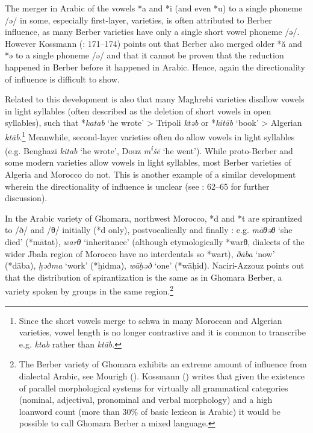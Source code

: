 \documentclass[output=paper]{langsci/langscibook}
\begin{document}
  The merger in Arabic of the vowels *{a} and *{i} (and even *{u}) to a single phoneme /ǝ/ in some, especially first-layer, varieties, is often attributed to Berber influence, as many Berber varieties have only a single short vowel phoneme /ǝ/. However Kossmann (\citeyear{Kossmann2013book}: 171–174) points out that Berber also merged older *ă and *ǝ to a single phoneme /ǝ/ and that it cannot be proven that the reduction happened in Berber before it happened in Arabic. Hence, again the directionality of influence is difficult to show.

  Related to this development is also that many Maghrebi varieties disallow vowels in light syllables (often described as the deletion of short vowels in open syllables), such that *\textit{katab} ‘he wrote’ > Tripoli \textit{ktǝb} or *\textit{kitāb} ‘book’ > Algerian \textit{ktāb}.\footnote{Since the short vowels merge to schwa in many Moroccan and Algerian varieties, vowel length is no longer contrastive and it is common to transcribe e.g. \textit{ktab} rather than \textit{ktāb}.} Meanwhile, second-layer varieties often do allow vowels in light syllables (e.g. Benghazi \textit{kitab} ‘he wrote’, Douz \textit{m\textsuperscript{i}}\textit{šē} ‘he went’). While proto-Berber and some modern varieties allow vowels in light syllables, most Berber varieties of Algeria and Morocco do not. This is another example of a similar development wherein the directionality of influence is unclear (see \citealt{Souag2017syllable}: 62–65 for further discussion).

  In the Arabic variety of Ghomara, northwest Morocco, *d and *t are spirantized to /ð/ and /θ/ initially (*d only), postvocalically and finally \citep{Naciri-Azzouz2016}: e.g. \textit{māθǝθ} `she died' (*mātat), \textit{warθ} `inheritance' (although etymologically *warθ, dialects of the wider Jbala region of Morocco have no interdentals so *wart), \textit{ðāba} `now' (*dāba), \textit{ḫǝðma} `work' (*ḫidma), \textit{wāḥǝð} `one' (*wāḥid). Naciri-Azzouz points out that the distribution of spirantization is the same as in Ghomara Berber, a variety spoken by groups in the same region.\footnote{The Berber variety of Ghomara exhibits an extreme amount of influence from dialectal Arabic, see Mourigh (\citeyear{Mourigh2015}). Kossmann (\citeyear[431]{Kossmann2013book}) writes that given the existence of parallel morphological systems for virtually all grammatical categories (nominal, adjectival, pronominal and verbal morphology) and a high loanword count (more than 30\% of basic lexicon is Arabic) it would be possible to call Ghomara Berber a mixed language.}
\end{document}
